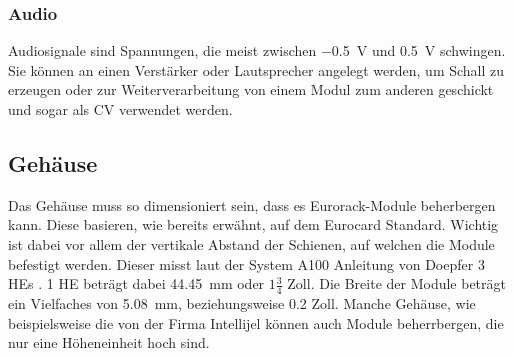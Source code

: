 \subsubsection{Audio}
\label{sec:orgc0b7a28}
Audiosignale sind Spannungen, die meist zwischen \SI{-0.5}{\volt} und \SI{0.5}{\volt} schwingen. Sie können an einen Verstärker oder Lautsprecher angelegt werden, um Schall zu erzeugen oder zur Weiterverarbeitung von einem Modul zum anderen geschickt und sogar als \acl{CV} verwendet werden. 


\newpage

\subsection{Gehäuse}
\label{sec:org3de5af9}
Das Gehäuse muss so dimensioniert sein, dass es Eurorack-Module beherbergen kann. Diese basieren, wie bereits erwähnt, auf dem Eurocard Standard. Wichtig ist dabei vor allem der vertikale Abstand der Schienen, auf welchen die Module befestigt werden. Dieser misst laut der System A100 Anleitung von Doepfer 3 \acp{HE} \cite{doepfer:A-100}. 1 \ac{HE} beträgt dabei \SI{44.45}{\milli\meter} oder \(1\frac{3}{4}\) Zoll. Die Breite der Module beträgt ein Vielfaches von \SI{5.08}{\milli\meter}, beziehungsweise 0.2 Zoll. Manche Gehäuse, wie beispielsweise die von der Firma Intellijel können auch Module beherrbergen, die nur eine Höheneinheit hoch sind.
